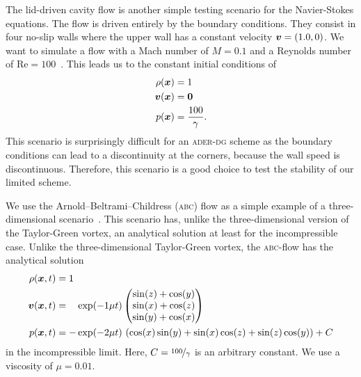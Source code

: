 The lid-driven cavity flow is another simple testing scenario for the Navier-Stokes equations.
The flow is driven entirely by the boundary conditions.
They consist in four no-slip walls where the upper wall has a constant velocity $\bm{v} = (1.0, 0)$.
We want to simulate a flow with a Mach number of $M = 0.1$ and a Reynolds number of $\text{Re} = 100$~\cite{fambri2017space}.
This leads us to the constant initial conditions of
\begin{align}
  \label{eq:lid-driven-cavity}
  \begin{split}
  \rho(\bm{x}) &= 1\\
  \bm{v}(\bm{x}) &=  \bm{0}\\
  p(\bm{x}) &= \frac{100}{\gamma}.
  \end{split}
\end{align}
This scenario is surprisingly difficult for an \textsc{ader-dg} scheme as the boundary conditions can lead to a discontinuity at the corners, because the wall speed is discontinuous.
Therefore, this scenario is a good choice to test the stability of our limited scheme.

We use the Arnold–Beltrami–Childress (\textsc{abc}) flow as a simple example of a three-dimensional scenario~\cite{tavelli2016staggered}.
This scenario has, unlike the three-dimensional version of the Taylor-Green vortex, an analytical solution at least for the incompressible case.
Unlike the three-dimensional Taylor-Green vortex, the \textsc{abc}-flow has the analytical solution
\begin{align}
  \label{eq:abc-flow}
  \begin{split}
  \rho(\bm{x}, t) &= 1\\
  \bm{v}(\bm{x}, t) &= \phantom{-} \exp(-1\mu t)
  \begin{pmatrix}
    \sin(z) + \cos(y)\\
    \sin(x) + \cos(z)\\
    \sin(y) + \cos(x)
  \end{pmatrix} \\
  p(\bm{x}, t) &= -\exp(-2 \mu t) \, \left(\cos(x)\sin(y) + \sin(x)\cos(z) + \sin(z)\cos(y)\right)
  + C
  \end{split}
\end{align}
in the incompressible limit.
Here, $C = \nicefrac{100}{\gamma}$ is an arbitrary constant.
We use a viscosity of $\mu = 0.01$.

